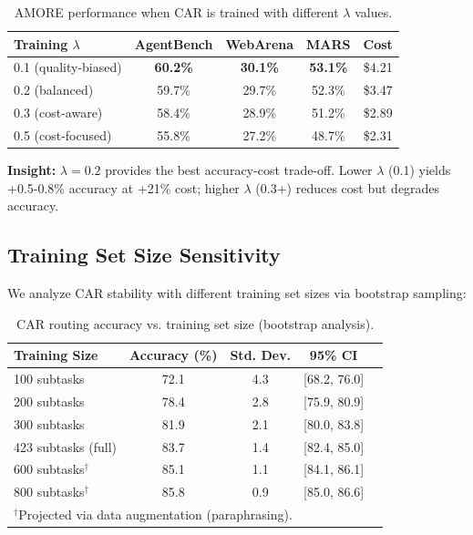 \documentclass{article}
\theoremstyle{plain}
\theoremstyle{definition}
\theoremstyle{remark}
\begin{document}
\begin{table}[h]
\centering
\caption{AMORE performance when CAR is trained with different $\lambda$ values.}
\label{tab:lambda-performance}
\small
\begin{tabular}{lcccc}
\toprule
\textbf{Training $\lambda$} & \textbf{AgentBench} & \textbf{WebArena} & \textbf{MARS} & \textbf{Cost} \\
\midrule
0.1 (quality-biased) & \textbf{60.2\%} & \textbf{30.1\%} & \textbf{53.1\%} & \$4.21 \\
0.2 (balanced) & 59.7\% & 29.7\% & 52.3\% & \$3.47 \\
0.3 (cost-aware) & 58.4\% & 28.9\% & 51.2\% & \$2.89 \\
0.5 (cost-focused) & 55.8\% & 27.2\% & 48.7\% & \$2.31 \\
\bottomrule
\end{tabular}
\end{table}

\textbf{Insight:} $\lambda=0.2$ provides the best accuracy-cost trade-off. Lower $\lambda$ (0.1) yields +0.5-0.8\% accuracy at +21\% cost; higher $\lambda$ (0.3+) reduces cost but degrades accuracy.

\subsection{Training Set Size Sensitivity}

We analyze CAR stability with different training set sizes via bootstrap sampling:

\begin{table}[h]
\centering
\caption{CAR routing accuracy vs. training set size (bootstrap analysis).}
\label{tab:training-size}
\small
\begin{tabular}{lcccc}
\toprule
\textbf{Training Size} & \textbf{Accuracy (\%)} & \textbf{Std. Dev.} & \textbf{95\% CI} \\
\midrule
100 subtasks & 72.1 & 4.3 & [68.2, 76.0] \\
200 subtasks & 78.4 & 2.8 & [75.9, 80.9] \\
300 subtasks & 81.9 & 2.1 & [80.0, 83.8] \\
423 subtasks (full) & 83.7 & 1.4 & [82.4, 85.0] \\
600 subtasks$^\dagger$ & 85.1 & 1.1 & [84.1, 86.1] \\
800 subtasks$^\dagger$ & 85.8 & 0.9 & [85.0, 86.6] \\
\bottomrule
\multicolumn{4}{l}{\footnotesize $^\dagger$Projected via data augmentation (paraphrasing).}
\end{tabular}
\end{table}
\end{document}
